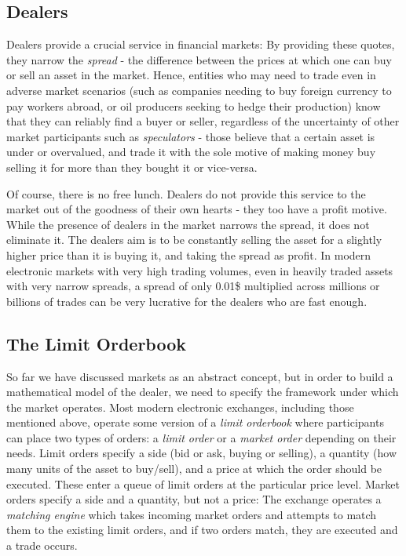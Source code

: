 \subsection*{Dealers}
Dealers provide a crucial service in financial markets: By providing these quotes, 
they narrow the \textit{spread} - the difference between the prices at which one can 
buy or sell an asset in the market. Hence, entities who may need to trade even in 
adverse market scenarios (such as companies needing to buy foreign currency to pay 
workers abroad, or oil producers seeking to hedge their production) know that they 
can reliably find a buyer or seller, regardless of the uncertainty of other market 
participants such as \textit{speculators} - those believe that a certain asset is 
under or overvalued, and trade it with the sole motive of making money buy selling 
it for more than they bought it or vice-versa.

Of course, there is no free lunch. Dealers do not provide this service to the market 
out of the goodness of their own hearts - they too have a profit motive. While the 
presence of dealers in the market narrows the spread, it does not eliminate it. 
The dealers aim is to be constantly selling the asset for a slightly higher price 
than it is buying it, and taking the spread as profit. In modern electronic markets 
with very high trading volumes, even in heavily traded assets with very narrow 
spreads, a spread of only 0.01\$ multiplied across millions or billions of trades 
can be very lucrative for the dealers who are fast enough.

\subsection*{The Limit Orderbook}
So far we have discussed markets as an abstract concept, but in order to build a 
mathematical model of the dealer, we need to specify the framework under which the 
market operates. Most modern electronic exchanges, including those mentioned above, 
operate some version of a \textit{limit orderbook} where participants can place two 
types of orders: a \textit{limit order} or a \textit{market order} depending on their 
needs. Limit orders specify a side (bid or ask, buying or selling), a quantity (how 
many units of the asset to buy/sell), and a price at which the order should be 
executed. These enter a queue of limit orders at the particular price level. Market 
orders specify a side and a quantity, but not a price: The exchange operates a 
\textit{matching engine} which takes incoming market orders and attempts to match 
them to the existing limit orders, and if two orders match, they are executed and a 
trade occurs. 

